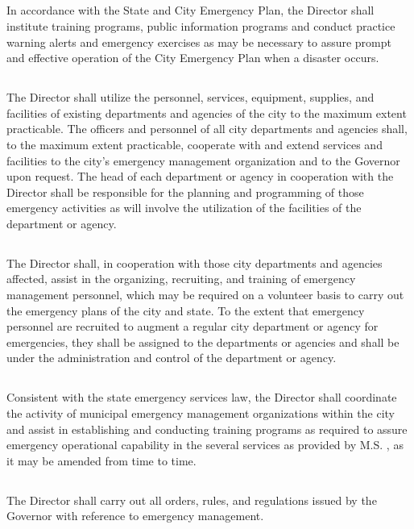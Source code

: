 \documentclass[code.tex]{subfiles}
\begin{document}
\subsection{}
In accordance with the State and City Emergency Plan, the Director shall institute training programs, public information programs and conduct practice warning alerts and emergency exercises as may be necessary to assure prompt and effective operation of the City Emergency Plan when a disaster occurs.
\subsection{}
The Director shall utilize the personnel, services, equipment, supplies, and facilities of existing departments and agencies of the city to the maximum extent practicable. The officers and personnel of all city departments and agencies shall, to the maximum extent practicable, cooperate with and extend services and facilities to the city’s emergency management organization and to the Governor upon request. The head of each department or agency in cooperation with the Director shall be responsible for the planning and programming of those emergency activities as will involve the utilization of the facilities of the department or agency.
\subsection{}
The Director shall, in cooperation with those city departments and agencies affected, assist in the organizing, recruiting, and training of emergency management personnel, which may be required on a volunteer basis to carry out the emergency plans of the city and state.   To the extent that emergency personnel are recruited to augment a regular city department or agency for emergencies, they shall be assigned to the departments or agencies and shall be under the administration and control of the department or agency.
\subsection{}
Consistent with the state emergency services law, the Director shall coordinate the activity of municipal emergency management organizations within the city and assist in establishing and conducting training programs as required to assure emergency operational capability in the several services as provided by M.S. , as it may be amended from time to time.
\subsection{}
The Director shall carry out all orders, rules, and regulations issued by the Governor with reference to emergency management.
\end{document}
